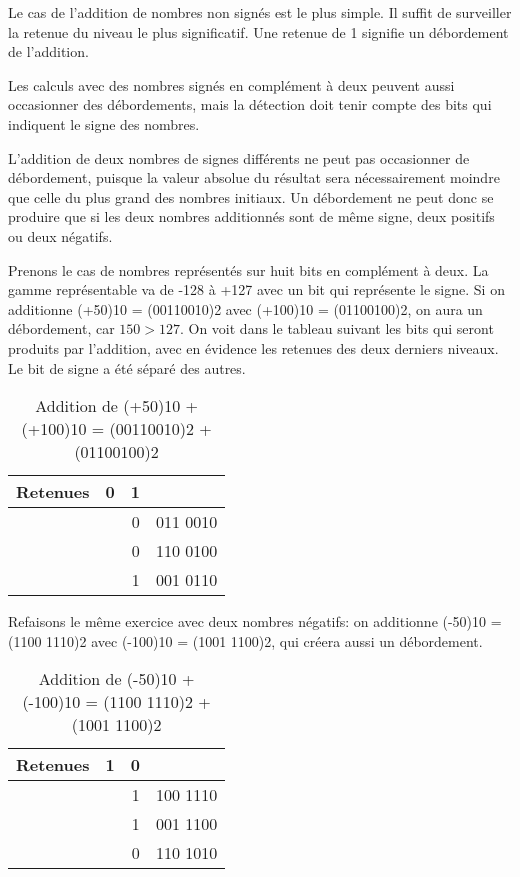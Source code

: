 \documentclass[letter, oneside]{book}
\begin{document}
\begin{enumerate}
Le cas de l'addition de nombres non signés est le plus simple. Il
suffit de surveiller la retenue du niveau le plus significatif. Une
retenue de 1 signifie un débordement de l'addition.

Les calculs avec des nombres signés en complément à deux peuvent aussi
occasionner des débordements, mais la détection doit tenir compte des
bits qui indiquent le signe des nombres.

L'addition de deux nombres de signes différents ne peut pas
occasionner de débordement, puisque la valeur absolue du résultat sera
nécessairement moindre que celle du plus grand des nombres
initiaux. Un débordement ne peut donc se produire que si les deux
nombres additionnés sont de même signe, deux positifs ou deux
négatifs.

Prenons le cas de nombres représentés sur huit bits en complément à
deux. La gamme représentable va de -128 à +127 avec un bit qui
représente le signe. Si on additionne (+50)10 = (00110010)2 avec
(+100)10 = (01100100)2, on aura un débordement, car \(150 > 127\). On
voit dans le tableau suivant les bits qui seront produits par
l'addition, avec en évidence les retenues des deux derniers
niveaux. Le bit de signe a été séparé des autres.

\begin{table}[htbp]
\caption{\label{tab:orgdc22722}Addition de (+50)10 + (+100)10 = (00110010)2 + (01100100)2}
\centering
\begin{tabular}{lrrl}
Retenues & 0 & 1 & \\[0pt]
\hline
 &  & 0 & 011 0010\\[0pt]
 &  & 0 & 110 0100\\[0pt]
\hline
 &  & 1 & 001 0110\\[0pt]
\end{tabular}
\end{table}

Refaisons le même exercice avec deux nombres négatifs: on additionne
(-50)10 = (1100 1110)2 avec (-100)10 = (1001 1100)2, qui créera aussi un
débordement.

\begin{table}[htbp]
\caption{\label{tab:org4c345d6}Addition de (-50)10 + (-100)10 = (1100 1110)2 + (1001 1100)2}
\centering
\begin{tabular}{lrrl}
Retenues & 1 & 0 & \\[0pt]
\hline
 &  & 1 & 100 1110\\[0pt]
 &  & 1 & 001 1100\\[0pt]
\hline
 &  & 0 & 110 1010\\[0pt]
\end{tabular}
\end{table}


\end{enumerate}
\end{document}
